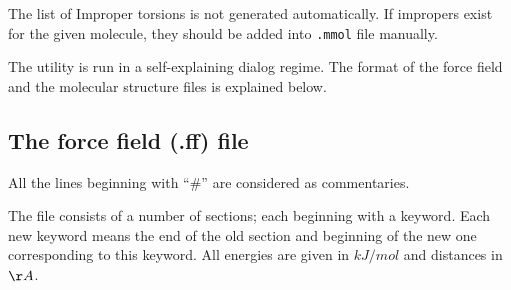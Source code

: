 \documentclass{article}
\begin{document}
The list of Improper torsions is not generated automatically. If impropers
exist for the given molecule, they should be added into \verb|.mmol| file 
manually. 

The utility is run in a self-explaining dialog regime. The format of
the force field and the molecular structure files is explained below.

\subsection{The force field (.ff) file}

All the lines beginning with ``\#'' are considered as commentaries.

The file consists of a number of sections; each beginning with a keyword.
Each new keyword means the end of the old section and beginning of the 
new one corresponding to this keyword. All energies are given in $kJ/mol$
and distances in $\AA$.
\end{document}
